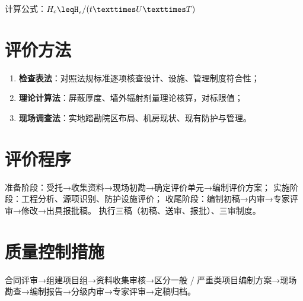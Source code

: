 计算公式：$H_{c}\leqH_{e}/(t×U×T)$

\section{评价方法}

\begin{enumerate}
\item \textbf{检查表法}：对照法规标准逐项核查设计、设施、管理制度符合性；
\item \textbf{理论计算法}：屏蔽厚度、墙外辐射剂量理论核算，对标限值；
\item \textbf{现场调查法}：实地踏勘院区布局、机房现状、现有防护与管理。
\end{enumerate}

\section{评价程序}

准备阶段：受托→收集资料→现场初勘→确定评价单元→编制评价方案；
实施阶段：工程分析、源项识别、防护设施评价；
收尾阶段：编制初稿→内审→专家评审→修改→出具报批稿。
执行三稿（初稿、送审、报批）、三审制度。

\section{质量控制措施}

合同评审→组建项目组→资料收集审核→区分一般 / 严重类项目编制方案→现场勘查→编制报告→分级内审→专家评审→定稿归档。
